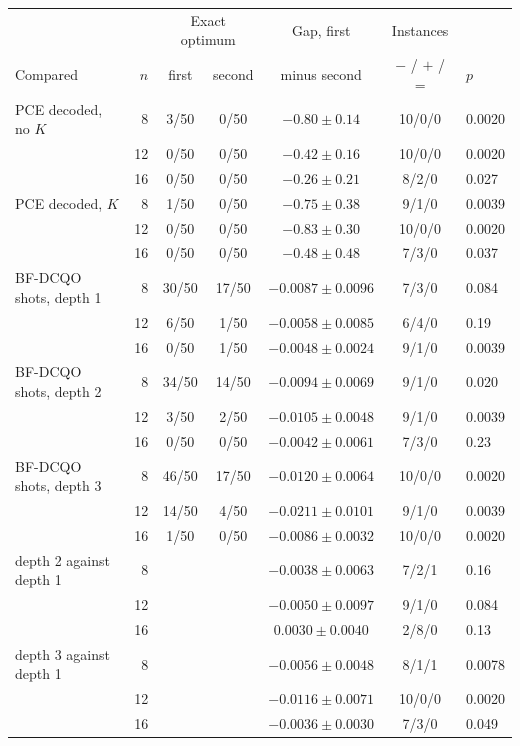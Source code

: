 \documentclass[11pt,a4paper]{article}
\begin{document}
\begin{table}[H]
\centering\footnotesize\setlength{\tabcolsep}{4pt}
\begin{tabular}{lrccccl}
\toprule
 & & \multicolumn{2}{c}{Exact optimum} & Gap, first & Instances & \\
Compared & $n$ & first & second & minus second & $-$ / $+$ / $=$ & $p$ \\
\midrule
PCE decoded, no $K$ & 8 & 3/50 & 0/50 & $-0.80 \pm 0.14$ & 10/0/0 & 0.0020 \\
 & 12 & 0/50 & 0/50 & $-0.42 \pm 0.16$ & 10/0/0 & 0.0020 \\
 & 16 & 0/50 & 0/50 & $-0.26 \pm 0.21$ & 8/2/0 & 0.027 \\
PCE decoded, $K$ & 8 & 1/50 & 0/50 & $-0.75 \pm 0.38$ & 9/1/0 & 0.0039 \\
 & 12 & 0/50 & 0/50 & $-0.83 \pm 0.30$ & 10/0/0 & 0.0020 \\
 & 16 & 0/50 & 0/50 & $-0.48 \pm 0.48$ & 7/3/0 & 0.037 \\
\midrule
BF-DCQO shots, depth 1 & 8 & 30/50 & 17/50 & $-0.0087 \pm 0.0096$ & 7/3/0 & 0.084 \\
 & 12 & 6/50 & 1/50 & $-0.0058 \pm 0.0085$ & 6/4/0 & 0.19 \\
 & 16 & 0/50 & 1/50 & $-0.0048 \pm 0.0024$ & 9/1/0 & 0.0039 \\
BF-DCQO shots, depth 2 & 8 & 34/50 & 14/50 & $-0.0094 \pm 0.0069$ & 9/1/0 & 0.020 \\
 & 12 & 3/50 & 2/50 & $-0.0105 \pm 0.0048$ & 9/1/0 & 0.0039 \\
 & 16 & 0/50 & 0/50 & $-0.0042 \pm 0.0061$ & 7/3/0 & 0.23 \\
BF-DCQO shots, depth 3 & 8 & 46/50 & 17/50 & $-0.0120 \pm 0.0064$ & 10/0/0 & 0.0020 \\
 & 12 & 14/50 & 4/50 & $-0.0211 \pm 0.0101$ & 9/1/0 & 0.0039 \\
 & 16 & 1/50 & 0/50 & $-0.0086 \pm 0.0032$ & 10/0/0 & 0.0020 \\
\midrule
depth 2 against depth 1 & 8 & & & $-0.0038 \pm 0.0063$ & 7/2/1 & 0.16 \\
 & 12 & & & $-0.0050 \pm 0.0097$ & 9/1/0 & 0.084 \\
 & 16 & & & $0.0030 \pm 0.0040$ & 2/8/0 & 0.13 \\
depth 3 against depth 1 & 8 & & & $-0.0056 \pm 0.0048$ & 8/1/1 & 0.0078 \\
 & 12 & & & $-0.0116 \pm 0.0071$ & 10/0/0 & 0.0020 \\
 & 16 & & & $-0.0036 \pm 0.0030$ & 7/3/0 & 0.049 \\

\end{tabular}
\end{table}
\end{document}
